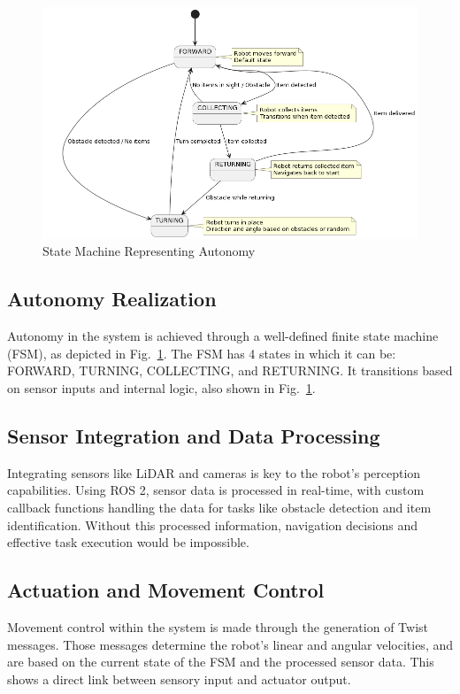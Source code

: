 \documentclass[conference]{IEEEtran}
\begin{document}
\begin{figure}[htbp]
\centerline{\includegraphics[width=\linewidth]{statediagram.png}}
\caption{State Machine Representing Autonomy}
\label{fig:statemachine}
\end{figure}

\subsection{Autonomy Realization}
Autonomy in the system is achieved through a well-defined finite state machine (FSM), as depicted in Fig.~\ref{fig:statemachine}. The FSM has 4 states in which it can be: FORWARD, TURNING, COLLECTING, and RETURNING. It transitions based on sensor inputs and internal logic, also shown in Fig.~\ref{fig:statemachine}.

\subsection{Sensor Integration and Data Processing}
Integrating sensors like LiDAR and cameras is key to the robot's perception capabilities. Using ROS 2, sensor data is processed in real-time, with custom callback functions handling the data for tasks like obstacle detection and item identification. Without this processed information, navigation decisions and effective task execution would be impossible.

\subsection{Actuation and Movement Control}
Movement control within the system is made through the generation of Twist messages. Those messages determine the robot's linear and angular velocities, and are based on the current state of the FSM and the processed sensor data. This shows a direct link between sensory input and actuator output.
\end{document}
